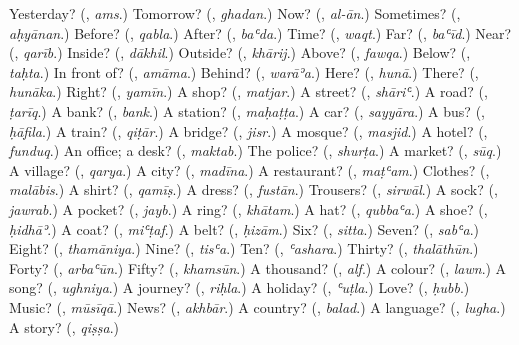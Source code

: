 \begin{tcolorbox}[breakable,colback=teal!4,colframe=teal!35!black,title={Before you move on}]
Yesterday? (\textbf{}, \emph{ams}.) Tomorrow? (\textbf{}, \emph{ghadan}.) Now? (\textbf{}, \emph{al-ān}.) Sometimes? (\textbf{}, \emph{aḥyānan}.) Before? (\textbf{}, \emph{qabla}.) After? (\textbf{}, \emph{baʿda}.) Time? (\textbf{}, \emph{waqt}.) Far? (\textbf{}, \emph{baʿīd}.) Near? (\textbf{}, \emph{qarīb}.) Inside? (\textbf{}, \emph{dākhil}.) Outside? (\textbf{}, \emph{khārij}.) Above? (\textbf{}, \emph{fawqa}.) Below? (\textbf{}, \emph{taḥta}.) In front of? (\textbf{}, \emph{amāma}.) Behind? (\textbf{}, \emph{warāʾa}.) Here? (\textbf{}, \emph{hunā}.) There? (\textbf{}, \emph{hunāka}.) Right? (\textbf{}, \emph{yamīn}.) A shop? (\textbf{}, \emph{matjar}.) A street? (\textbf{}, \emph{shāriʿ}.) A road? (\textbf{}, \emph{ṭarīq}.) A bank? (\textbf{}, \emph{bank}.) A station? (\textbf{}, \emph{maḥaṭṭa}.) A car? (\textbf{}, \emph{sayyāra}.) A bus? (\textbf{}, \emph{ḥāfila}.) A train? (\textbf{}, \emph{qiṭār}.) A bridge? (\textbf{}, \emph{jisr}.) A mosque? (\textbf{}, \emph{masjid}.) A hotel? (\textbf{}, \emph{funduq}.) An office; a desk? (\textbf{}, \emph{maktab}.) The police? (\textbf{}, \emph{shurṭa}.) A market? (\textbf{}, \emph{sūq}.) A village? (\textbf{}, \emph{qarya}.) A city? (\textbf{}, \emph{madīna}.) A restaurant? (\textbf{}, \emph{maṭʿam}.) Clothes? (\textbf{}, \emph{malābis}.) A shirt? (\textbf{}, \emph{qamīṣ}.) A dress? (\textbf{}, \emph{fustān}.) Trousers? (\textbf{}, \emph{sirwāl}.) A sock? (\textbf{}, \emph{jawrab}.) A pocket? (\textbf{}, \emph{jayb}.) A ring? (\textbf{}, \emph{khātam}.) A hat? (\textbf{}, \emph{qubbaʿa}.) A shoe? (\textbf{}, \emph{ḥidhāʾ}.) A coat? (\textbf{}, \emph{miʿṭaf}.) A belt? (\textbf{}, \emph{ḥizām}.) Six? (\textbf{}, \emph{sitta}.) Seven? (\textbf{}, \emph{sabʿa}.) Eight? (\textbf{}, \emph{thamāniya}.) Nine? (\textbf{}, \emph{tisʿa}.) Ten? (\textbf{}, \emph{ʿashara}.) Thirty? (\textbf{}, \emph{thalāthūn}.) Forty? (\textbf{}, \emph{arbaʿūn}.) Fifty? (\textbf{}, \emph{khamsūn}.) A thousand? (\textbf{}, \emph{alf}.) A colour? (\textbf{}, \emph{lawn}.) A song? (\textbf{}, \emph{ughniya}.) A journey? (\textbf{}, \emph{riḥla}.) A holiday? (\textbf{}, \emph{ʿuṭla}.) Love? (\textbf{}, \emph{ḥubb}.) Music? (\textbf{}, \emph{mūsīqā}.) News? (\textbf{}, \emph{akhbār}.) A country? (\textbf{}, \emph{balad}.) A language? (\textbf{}, \emph{lugha}.) A story? (\textbf{}, \emph{qiṣṣa}.)
\end{tcolorbox}
